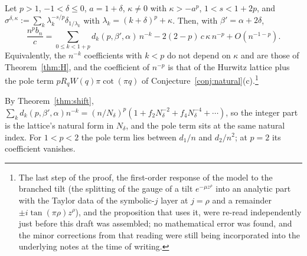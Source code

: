 \begin{theorem}\label{thm:kappa}
Let $p>1$, $-1<\delta\le0$, $a=1+\delta$, $\kappa\ne0$ with $\kappa>-a^p$, $1<s<1+2p$, and
$\sigma^{\delta,\kappa}:=\sum_k\lambda_k^{-s/p}\delta_{1/\lambda_k}$ with $\lambda_k=(k+\delta)^p+\kappa$. Then, with $\beta'=\alpha+2\delta$,
\[
  \frac{n^pb_n}c=\sum_{0\le k<1+p}d_k(p,\beta',\alpha)\,n^{-k}-2(2-p)\,c\,\kappa\,n^{-p}+O(n^{-1-p}).
\]
Equivalently, the $n^{-k}$ coefficients with $k<p$ do not depend on $\kappa$ and are those of Theorem~\ref{thm:H}, and the
coefficient of $n^{-p}$ is that of the Hurwitz lattice plus the pole term $pR_qW(q)\pi\cot(\pi q)$ of
Conjecture~\ref{conj:natural}(c).\footnote{The last step of the proof, the first-order response of the model to the branched tilt
(the splitting of the gauge of a tilt $e^{-\mu z^\rho}$ into an analytic part with the Taylor data of the symbolic-$j$ layer at $j=\rho$
and a remainder $\pm i\tan(\pi\rho)z^\rho$), and the proposition that uses it, were re-read independently just before this
draft was assembled; no mathematical error was found, and the minor corrections from that reading were still being incorporated
into the underlying notes at the time of writing.}
\end{theorem}

By Theorem~\ref{thm:shift}, $\sum_kd_k(p,\beta',\alpha)n^{-k}=(n/N_\delta)^p(1+f_2N_\delta^{-2}+f_4N_\delta^{-4}+\dotsb)$, so the integer part is
the lattice's natural form in $N_\delta$, and the pole term sits at the same natural index. For $1<p<2$ the pole term lies between
$d_1/n$ and $d_2/n^2$; at $p=2$ its coefficient vanishes.

